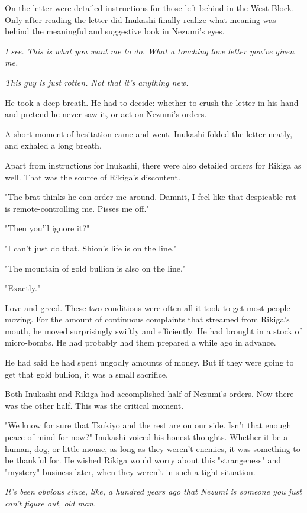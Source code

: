 On the letter were detailed instructions for those left behind in the
West Block. Only after reading the letter did Inukashi finally realize
what meaning was behind the meaningful and suggestive look in Nezumi's
eyes.

\emph{I see. This is what you want me to do. What a touching love letter
you've given me.}

\emph{This guy is just rotten. Not that it's anything new.}

He took a deep breath. He had to decide: whether to crush the letter in
his hand and pretend he never saw it, or act on Nezumi's orders.

A short moment of hesitation came and went. Inukashi folded the letter
neatly, and exhaled a long breath.

Apart from instructions for Inukashi, there were also detailed orders
for Rikiga as well. That was the source of Rikiga's discontent.

"The brat thinks he can order me around. Damnit, I feel like that
despicable rat is remote-controlling me. Pisses me off."

"Then you'll ignore it?"

"I can't just do that. Shion's life is on the line."

"The mountain of gold bullion is also on the line."

"Exactly."

Love and greed. These two conditions were often all it took to get most
people moving. For the amount of continuous complaints that streamed
from Rikiga's mouth, he moved surprisingly swiftly and efficiently. He
had brought in a stock of micro-bombs. He had probably had them prepared
a while ago in advance.

He had said he had spent ungodly amounts of money. But if they were
going to get that gold bullion, it was a small sacrifice.

Both Inukashi and Rikiga had accomplished half of Nezumi's orders. Now
there was the other half. This was the critical moment.

"We know for sure that Tsukiyo and the rest are on our side. Isn't that
enough peace of mind for now?" Inukashi voiced his honest thoughts.
Whether it be a human, dog, or little mouse, as long as they weren't
enemies, it was something to be thankful for. He wished Rikiga would
worry about this "strangeness" and "mystery" business later, when they
weren't in such a tight situation.

\emph{It's been obvious since, like, a hundred years ago that Nezumi is
someone you just can't figure out, old man.}


